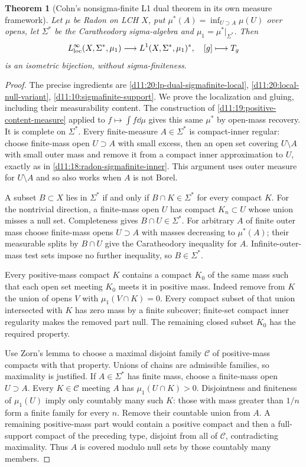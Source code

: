 \documentclass[11pt,oneside,openany]{book}
\newtheorem{theorem}{Theorem}[chapter]
\theoremstyle{definition}
\theoremstyle{remark}
\newcommand{\family}[1]{}
\begin{document}
\begin{theorem}[Cohn's nonsigma-finite L1 dual theorem in its own measure framework]\family{D11.20.local_null_endpoint_specialization}\label{d11:20:local-null-endpoint-specialization}
Let $\mu$ be Radon on LCH $X$, put $\mu^*(A)=\inf_{U\supset A}\mu(U)$ over opens, let $\Sigma^*$ be the Caratheodory sigma-algebra and $\mu_1=\mu^*|_{\Sigma^*}$. Then
\[L^\infty_{\rm loc}(X,\Sigma^*,\mu_1)\longrightarrow L^1(X,\Sigma^*,\mu_1)^*,\quad [g]\longmapsto T_g
\]
is an isometric bijection, without sigma-finiteness.
\end{theorem}
\begin{proof}
The precise ingredients are \cref{d11:20:lp-dual-sigmafinite-local}, \cref{d11:20:local-null-variant}, \cref{d11:10:sigmafinite-support}. We prove the localization and gluing, including their measurability content. The construction of \cref{d11:19:positive-content-measure} applied to $f\mapsto\int f\dd\mu$ gives this same $\mu^*$ by open-mass recovery. It is complete on $\Sigma^*$. Every finite-measure $A\in\Sigma^*$ is compact-inner regular: choose finite-mass open $U\supset A$ with small excess, then an open set covering $U\setminus A$ with small outer mass and remove it from a compact inner approximation to $U$, exactly as in \cref{d11:18:radon-sigmafinite-inner}. This argument uses outer measure for $U\setminus A$ and so also works when $A$ is not Borel.

A subset $B\subset X$ lies in $\Sigma^*$ if and only if $B\cap K\in\Sigma^*$ for every compact $K$. For the nontrivial direction, a finite-mass open $U$ has compact $K_n\subset U$ whose union misses a null set. Completeness gives $B\cap U\in\Sigma^*$. For arbitrary $A$ of finite outer mass choose finite-mass opens $U\supset A$ with masses decreasing to $\mu^*(A)$; their measurable splits by $B\cap U$ give the Caratheodory inequality for $A$. Infinite-outer-mass test sets impose no further inequality, so $B\in\Sigma^*$.

Every positive-mass compact $K$ contains a compact $K_0$ of the same mass such that each open set meeting $K_0$ meets it in positive mass. Indeed remove from $K$ the union of opens $V$ with $\mu_1(V\cap K)=0$. Every compact subset of that union intersected with $K$ has zero mass by a finite subcover; finite-set compact inner regularity makes the removed part null. The remaining closed subset $K_0$ has the required property.

Use Zorn's lemma to choose a maximal disjoint family $\mathcal C$ of positive-mass compacts with that property. Unions of chains are admissible families, so maximality is justified. If $A\in\Sigma^*$ has finite mass, choose a finite-mass open $U\supset A$. Every $K\in\mathcal C$ meeting $A$ has $\mu_1(U\cap K)>0$. Disjointness and finiteness of $\mu_1(U)$ imply only countably many such $K$: those with mass greater than $1/n$ form a finite family for every $n$. Remove their countable union from $A$. A remaining positive-mass part would contain a positive compact and then a full-support compact of the preceding type, disjoint from all of $\mathcal C$, contradicting maximality. Thus $A$ is covered modulo null sets by those countably many members.


\end{proof}
\end{document}

